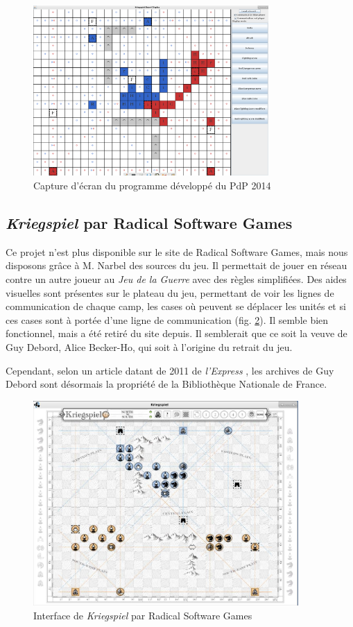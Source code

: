 \documentclass[a4paper]{report}
\begin{document}
\begin{figure}[H]
\centering
\includegraphics[width=0.8\textwidth]{existantPDP/pdp2014}
\caption{Capture d'écran du programme développé du PdP 2014}\label{fig:PdP2014Com}
\end{figure}


\subsection*{\textit{Kriegspiel} par Radical Software Games\cite{rsg}}
Ce projet n'est plus disponible sur le site de Radical Software Games, mais nous disposons grâce à M. Narbel des sources du jeu. Il permettait de jouer en réseau contre un autre joueur au \textit{Jeu de la Guerre} avec des règles simplifiées. Des aides visuelles sont présentes sur le plateau du jeu, permettant de voir les lignes de communication de chaque camp, les cases où peuvent se déplacer les unités et si ces cases sont à portée d'une ligne de communication (fig. \ref{fig:jdgRSG}). Il semble bien fonctionnel, mais a été retiré du site depuis. Il semblerait que ce soit la veuve de Guy Debord, Alice Becker-Ho, qui soit à l'origine du retrait\cite{finmot-rsg} du jeu.

Cependant, selon un article datant de 2011 de \textit{l'Express} \cite{bnfDebord}, les archives de Guy Debord sont désormais la propriété de la Bibliothèque Nationale de France.

\begin{figure}[H]
\centering
\includegraphics[width=0.9\textwidth]{existantRSG/rsg}
\caption{Interface de \textit{Kriegspiel} par Radical Software Games}\label{fig:jdgRSG}
\end{figure}
\end{document}
